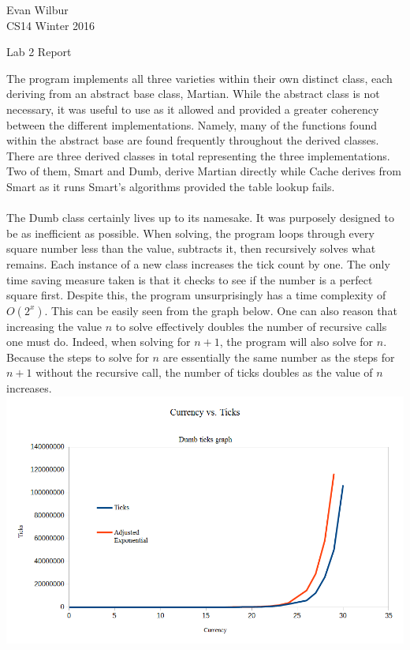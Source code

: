 \documentclass{article}
\theoremstyle{definition}
\begin{document}
\noindent Evan Wilbur \\
CS14 Winter 2016\\
\begin{center}
Lab 2 Report
\end{center}

The program implements all three varieties within their own distinct class, each deriving from an abstract base class, Martian. While the abstract class is not necessary, it was useful to use as it allowed and provided a greater coherency between the  different implementations. Namely, many of the functions found within the abstract base are found frequently throughout the derived classes. There are three derived classes in total representing the three implementations. Two of them, Smart and Dumb, derive Martian directly while Cache derives from Smart as it runs Smart's algorithms provided the table lookup fails.\\
\\
\indent The Dumb class certainly lives up to its namesake. It was purposely designed to be as inefficient as possible. When solving, the program loops through every square number less than the value, subtracts it, then recursively solves what remains. Each instance of a new class increases the tick count by one. The only time saving measure taken is that it checks to see if the number is a perfect square first. Despite this, the program unsurprisingly has a time complexity of $O(2^x)$. This can be easily seen from the graph below. One can also reason that increasing the value $n$ to solve effectively doubles the number of recursive calls one must do. Indeed, when solving for $n+1$, the program will also solve for $n$. Because the steps to solve for $n$ are essentially the same number as the steps for $n+1$ without the recursive call, the number of ticks doubles as the value of $n$ increases.
\includegraphics[width=\linewidth]{Dumb_reg}
\end{document}

